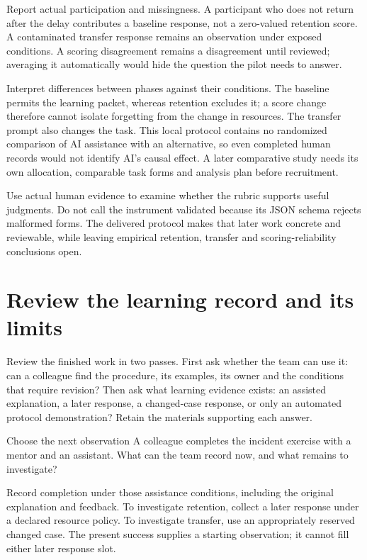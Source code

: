 Report actual participation and missingness. A participant who does not return after the delay contributes a baseline response, not a zero-valued retention score. A contaminated transfer response remains an observation under exposed conditions. A scoring disagreement remains a disagreement until reviewed; averaging it automatically would hide the question the pilot needs to answer.

Interpret differences between phases against their conditions. The baseline permits the learning packet, whereas retention excludes it; a score change therefore cannot isolate forgetting from the change in resources. The transfer prompt also changes the task. This local protocol contains no randomized comparison of AI assistance with an alternative, so even completed human records would not identify AI's causal effect. A later comparative study needs its own allocation, comparable task forms and analysis plan before recruitment.

Use actual human evidence to examine whether the rubric supports useful judgments. Do not call the instrument validated because its JSON schema rejects malformed forms. The delivered protocol makes that later work concrete and reviewable, while leaving empirical retention, transfer and scoring-reliability conclusions open.

\section{Review the learning record and its limits}\label{sec:ch13-review}

Review the finished work in two passes. First ask whether the team can use it: can a colleague find the procedure, its examples, its owner and the conditions that require revision? Then ask what learning evidence exists: an assisted explanation, a later response, a changed-case response, or only an automated protocol demonstration? Retain the materials supporting each answer.

\begin{practicebox}{Choose the next observation}
A colleague completes the incident exercise with a mentor and an assistant. What can the team record now, and what remains to investigate?

Record completion under those assistance conditions, including the original explanation and feedback. To investigate retention, collect a later response under a declared resource policy. To investigate transfer, use an appropriately reserved changed case. The present success supplies a starting observation; it cannot fill either later response slot.
\end{practicebox}

